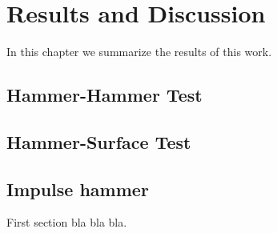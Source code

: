 \chapter{Results and Discussion}
\label{chp:results}

In this chapter we summarize the results of this work.


\section{Hammer-Hammer Test}

\section{Hammer-Surface Test}

\section{Impulse hammer}
\label{sec:first_sec}
First section bla bla bla. 